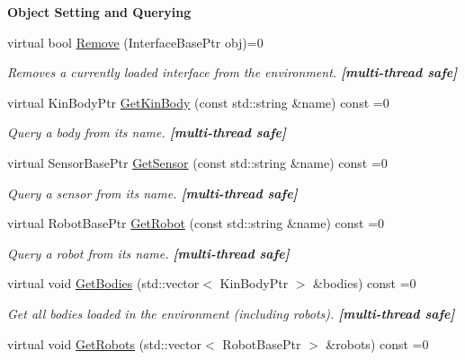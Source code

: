 \begin{Indent}{\bf Object Setting and Querying}
\begin{DoxyCompactItemize}
virtual bool \hyperlink{classOpenRAVE_1_1EnvironmentBase_add0aaa9d6ac1aaeb25b3c71b85a93e79}{Remove} (InterfaceBasePtr obj)=0
\begin{DoxyCompactList}\small\item\em Removes a currently loaded interface from the environment. {\bfseries \mbox{[}multi-\/thread safe\mbox{]}} \item\end{DoxyCompactList}\item 
virtual KinBodyPtr \hyperlink{classOpenRAVE_1_1EnvironmentBase_ad56e81b8f92ad253a7a15bfc3e022e9d}{GetKinBody} (const std::string \&name) const =0
\begin{DoxyCompactList}\small\item\em Query a body from its name. {\bfseries \mbox{[}multi-\/thread safe\mbox{]}} \item\end{DoxyCompactList}\item 
virtual SensorBasePtr \hyperlink{classOpenRAVE_1_1EnvironmentBase_a44f7b20622f42251dcdec78911f0fb20}{GetSensor} (const std::string \&name) const =0
\begin{DoxyCompactList}\small\item\em Query a sensor from its name. {\bfseries \mbox{[}multi-\/thread safe\mbox{]}} \item\end{DoxyCompactList}\item 
virtual RobotBasePtr \hyperlink{classOpenRAVE_1_1EnvironmentBase_a97772e0635e9a310288a9a47977d81f2}{GetRobot} (const std::string \&name) const =0
\begin{DoxyCompactList}\small\item\em Query a robot from its name. {\bfseries \mbox{[}multi-\/thread safe\mbox{]}} \item\end{DoxyCompactList}\item 
virtual void \hyperlink{classOpenRAVE_1_1EnvironmentBase_a7d408bb4332225ed07ac388b13d11a59}{GetBodies} (std::vector$<$ KinBodyPtr $>$ \&bodies) const =0
\begin{DoxyCompactList}\small\item\em Get all bodies loaded in the environment (including robots). {\bfseries \mbox{[}multi-\/thread safe\mbox{]}} \item\end{DoxyCompactList}\item 
\hypertarget{classOpenRAVE_1_1EnvironmentBase_a11cfa598243a4e0a9ced2e18e32f5c14}{
virtual void \hyperlink{classOpenRAVE_1_1EnvironmentBase_a11cfa598243a4e0a9ced2e18e32f5c14}{GetRobots} (std::vector$<$ RobotBasePtr $>$ \&robots) const =0}
\label{classOpenRAVE_1_1EnvironmentBase_a11cfa598243a4e0a9ced2e18e32f5c14}


\end{DoxyCompactItemize}
\end{Indent}
